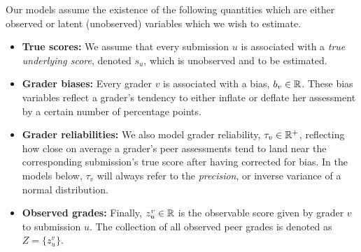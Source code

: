 Our models assume the existence of the following quantities which are either observed or 
latent (unobserved) variables which we wish to estimate.
\begin{itemize}
\item {\bf True scores:}
We assume that every submission $u$ is associated with a \emph{true underlying
score}, denoted $s_u$, which is unobserved and to be estimated. 
\item {\bf Grader biases:}
Every grader $v$ is associated with a bias, $b_v\in \mathbb{R}$.  These bias
variables reflect a grader's tendency to either inflate or deflate her assessment by a certain
number of percentage points.  
\item {\bf Grader reliabilities:}
We also model grader reliability, $\tau_v \in \mathbb{R}^+$, reflecting how close on average
a grader's peer assessments tend to land near the corresponding submission's true score after having
corrected for bias.  In the models
below, $\tau_v$ will always refer to the \emph{precision}, or inverse variance of a normal distribution.
\item {\bf Observed grades:} 
Finally, $z^v_u\in \mathbb{R}$ is the observable score given by grader $v$ to submission $u$.
The collection of all observed peer grades is denoted as  $Z=\{z^v_u\}$.
\end{itemize}

